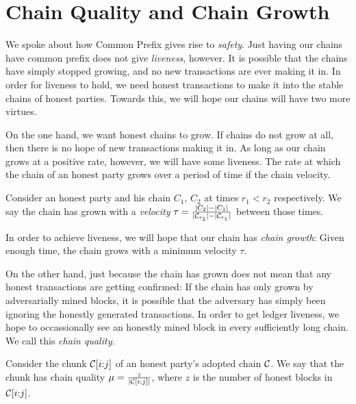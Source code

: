 \section{Chain Quality and Chain Growth}

We spoke about how Common Prefix gives rise to \emph{safety}. Just having our chains
have common prefix does not give \emph{liveness}, however. It is possible that the chains
have simply stopped growing, and no new transactions are ever making it in. In order
for liveness to hold, we need honest transactions to make it into the stable chains
of honest parties. Towards this, we will hope our chains will have two more virtues.

On the one hand, we want honest chains to grow. If chains do not grow at all, then
there is no hope of new transactions making it in. As long as our chain grows
at a positive rate, however, we will have some liveness. The rate at which the
chain of an honest party grows over a period of time if the chain velocity.

\begin{definition}
  Consider an honest party and his chain $C_1$, $C_2$ at times $r_1 < r_2$ respectively.
  We say the chain has grown with a \emph{velocity}
  $\tau = \frac{|C_2| - |C_1|}{|\mathcal{C}_{r_2}| - |\mathcal{C}_{r_1}|}$
  between those times.
\end{definition}

In order to achieve liveness, we will hope that our chain has \emph{chain growth}:
Given enough time, the chain grows with a minimum velocity $\tau$.

On the other hand, just because the chain has grown does not mean that any honest
transactions are getting confirmed: If the chain has only grown by adversarially mined
blocks, it is possible that the adversary has simply been ignoring the honestly generated
transactions. In order to get ledger liveness, we hope to occassionally see an honestly
mined block in every sufficiently long chain. We call this \emph{chain quality}.

\begin{definition}
  Consider the chunk $\mathcal{C}[i{:}j]$ of an honest party's adopted chain $\mathcal{C}$.
  We say that the chunk has chain quality $\mu = \frac{z}{|\mathcal{C}[i{:}j]|}$, where
  $z$ is the number of honest blocks in $\mathcal{C}[i{:}j]$.
\end{definition}

